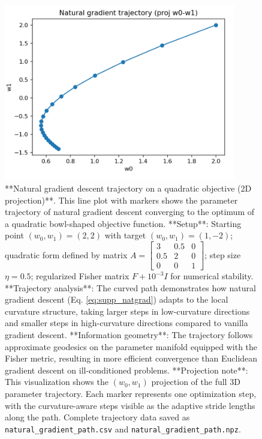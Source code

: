 \documentclass[
  10pt,
]{article}
\begin{document}
\begin{figure}[htbp]
\centering
\includegraphics[width=0.9\textwidth]{figures/natural_gradient_path.png}
\caption{**Natural gradient descent trajectory on a quadratic objective (2D projection)**. This line plot with markers shows the parameter trajectory of natural gradient descent converging to the optimum of a quadratic bowl-shaped objective function. **Setup**: Starting point $(w_0, w_1) = (2, 2)$ with target $(w_0, w_1) = (1, -2)$; quadratic form defined by matrix $A = \begin{bmatrix}3 & 0.5 & 0\\ 0.5 & 2 & 0\\ 0 & 0 & 1\end{bmatrix}$; step size $\eta = 0.5$; regularized Fisher matrix $F + 10^{-3} I$ for numerical stability. **Trajectory analysis**: The curved path demonstrates how natural gradient descent (Eq. \ref{eq:supp_natgrad}) adapts to the local curvature structure, taking larger steps in low-curvature directions and smaller steps in high-curvature directions compared to vanilla gradient descent. **Information geometry**: The trajectory follows approximate geodesics on the parameter manifold equipped with the Fisher metric, resulting in more efficient convergence than Euclidean gradient descent on ill-conditioned problems. **Projection note**: This visualization shows the $(w_0, w_1)$ projection of the full 3D parameter trajectory. Each marker represents one optimization step, with the curvature-aware steps visible as the adaptive stride lengths along the path. Complete trajectory data saved as \texttt{natural\_gradient\_path.csv} and \texttt{natural\_gradient\_path.npz}.}
\label{fig:natural_gradient_path}
\end{figure}
\end{document}
